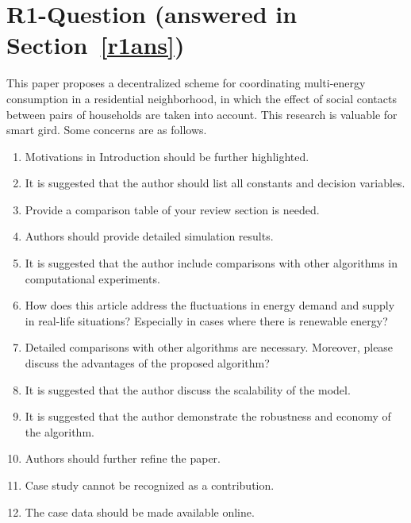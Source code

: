\documentclass[11pt]{article}
\newcommand{\sect}[1]{\textbf{Section}~\ref{#1}}
\begin{document}
\section{R1-Question (answered in \sect{r1ans})}
This paper proposes a decentralized scheme for coordinating multi-energy consumption in a residential neighborhood, in which the effect of social contacts between pairs of households are taken into account. This research is valuable for smart gird. Some concerns are as follows.
\begin{enumerate}
    \item Motivations in Introduction should be further highlighted.
    \item It is suggested that the author should list all constants and decision variables.
    \item Provide a comparison table of your review section is needed.
    \item Authors should provide detailed simulation results.
    \item It is suggested that the author include comparisons with other algorithms in computational experiments.
    \item How does this article address the fluctuations in energy demand and supply in real-life situations? Especially in cases where there is renewable energy?
    \item Detailed comparisons with other algorithms are necessary. Moreover, please discuss the advantages of the proposed algorithm?
    \item It is suggested that the author discuss the scalability of the model.
    \item It is suggested that the author demonstrate the robustness and economy of the algorithm.
    \item Authors should further refine the paper.
    \item Case study cannot be recognized as a contribution.
    \item The case data should be made available online.
\end{enumerate}
\end{document}
